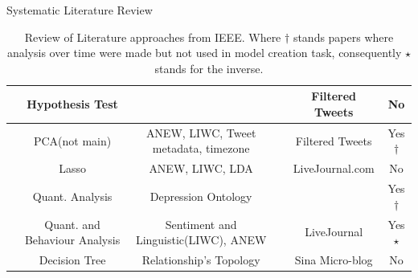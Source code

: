 \documentclass[aspectratio=169,10pt,xcolor={dvipsnames}]{beamer}
\begin{document}
\begin{frame}{Systematic Literature Review}
\begin{table}
{\begin{tabular}{c|c|c|c|c|c}
            \cite{nambisan_social_2015} & Hypothesis Test &&& Filtered Tweets & No\\ \hline
    
            \cite{larsen_we_2015} & PCA(not main) & ANEW, LIWC, Tweet metadata, timezone & & Filtered Tweets & Yes$\dagger$\\ \hline
    
            \cite{nguyen_affective_2014} & Lasso & ANEW, LIWC, LDA && LiveJournal.com & No\\ \hline
    
            \cite{fang_mental_2014} & Quant. Analysis & Depression Ontology & & & Yes$\dagger$\\ \hline
    
            \cite{dao_analysis_2014} & Quant. and Behaviour Analysis & Sentiment and Linguistic(LIWC), ANEW & & LiveJournal & Yes$\star$\\ \hline
    
            \cite{wang_improved_2013} & Decision Tree & Relationship's Topology & & Sina Micro-blog & No\\
    
    
          \end{tabular}%
            }
            \caption{\scriptsize{Review of Literature approaches from IEEE. Where $\dagger$ stands papers where analysis over time were made but not used in model creation task, consequently $\star$ stands for the inverse.}}
            \label{tab:IEEE_papers}
        \end{table}
      \end{frame}
\end{document}
